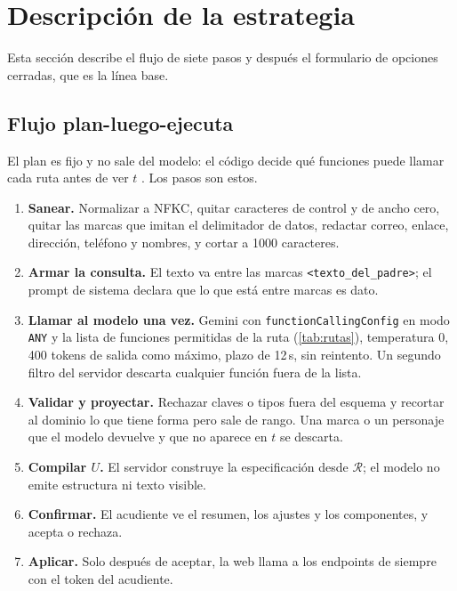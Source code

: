 \documentclass[11pt,letterpaper]{article}
\newcommand{\R}{\mathcal{R}}
\newcommand{\cod}[1]{\texttt{#1}}
\begin{document}
\section{Descripci\'on de la estrategia}\label{sec:estrategia}

Esta secci\'on describe el flujo de siete pasos y despu\'es el formulario de opciones cerradas, que es la
l\'inea base.

\subsection{Flujo plan-luego-ejecuta}

El plan es fijo y no sale del modelo: el c\'odigo decide qu\'e funciones puede llamar cada ruta antes de ver
$t$ \citep{beurerkellner2025patterns}. Los pasos son estos.
\begin{enumerate}
  \item \textbf{Sanear.} Normalizar a NFKC, quitar caracteres de control y de ancho cero, quitar las marcas que imitan
  el delimitador de datos, redactar correo, enlace, direcci\'on, tel\'efono y nombres, y cortar a 1000 caracteres.
  \item \textbf{Armar la consulta.} El texto va entre las marcas \cod{<texto\_del\_padre>}; el prompt de sistema
  declara que lo que est\'a entre marcas es dato.
  \item \textbf{Llamar al modelo una vez.} Gemini con \cod{functionCallingConfig} en modo \cod{ANY} y la lista de
  funciones permitidas de la ruta (\cref{tab:rutas}), temperatura 0, 400 tokens de salida como m\'aximo, plazo de 12\,s,
  sin reintento. Un segundo filtro del servidor descarta cualquier funci\'on fuera de la lista.
  \item \textbf{Validar y proyectar.} Rechazar claves o tipos fuera del esquema y recortar al dominio lo que tiene forma
  pero sale de rango. Una marca o un personaje que el modelo devuelve y que no aparece en $t$ se descarta.
  \item \textbf{Compilar $U$.} El servidor construye la especificaci\'on desde $\R$; el modelo no emite estructura ni
  texto visible.
  \item \textbf{Confirmar.} El acudiente ve el resumen, los ajustes y los componentes, y acepta o rechaza.
  \item \textbf{Aplicar.} Solo despu\'es de aceptar, la web llama a los endpoints de siempre con el token del acudiente.
\end{enumerate}
\end{document}
